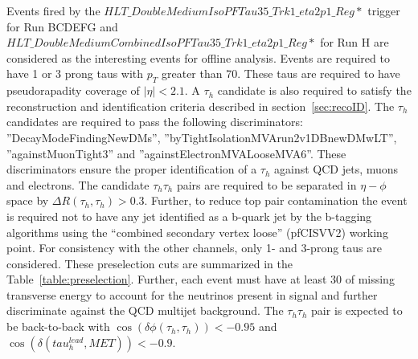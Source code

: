 Events fired by the $HLT\_DoubleMediumIsoPFTau35\_Trk1\_eta2p1\_Reg*$ trigger for Run BCDEFG and $HLT\_DoubleMediumCombinedIsoPFTau35\_Trk1\_eta2p1\_Reg*$ for Run H are considered as the interesting events for offline analysis. Events are required to have 1 or 3 prong taus with $p_{T}$ greater than 70\gev . These taus are required to have pseudorapadity coverage of $|\eta| < 2.1$. A $\tau_{h}$ candidate is also required to satisfy the reconstruction and identification criteria described in section~\ref{sec:recoID}. The $\tau_{h}$ candidates are required to pass the following discriminators: ''DecayModeFindingNewDMs'', ''byTightIsolationMVArun2v1DBnewDMwLT'', ''againstMuonTight3''  and ''againstElectronMVALooseMVA6''. These discriminators ensure the proper identification of a $\tau_{h}$ against QCD jets, muons and electrons. The candidate $\tau_{h}\tau_{h}$ pairs are required to be separated in $\eta-\phi$ space by $\Delta R(\tau_{h},\tau_{h}) > 0.3 $. Further, to reduce top pair contamination the event is required not to have any jet identified as a b-quark jet by the b-tagging algorithms using the ``combined secondary vertex loose'' (pfCISVV2) working point. For consistency with the other channels, only 1- and 3-prong taus are considered. These preselection cuts are summarized in the Table~\ref{table:preselection}. Further, each event must have at least 30 \gev of missing transverse energy to account for the neutrinos present in signal and further discriminate against the QCD multijet background.  The $\tau_{h}\tau_{h}$ pair is expected to be back-to-back with $\cos(\delta\phi(\tau_{h},\tau_{h})) < -0.95$ and $\cos(\delta(tau_{h}^{lead},MET))<-0.9$. 


\begin{table}[!htpb]
  \caption{Pre-selection criteria for the $\tau_{h}\tau_{h}$ channel.}
  \label{table:preselection}
\end{table}

